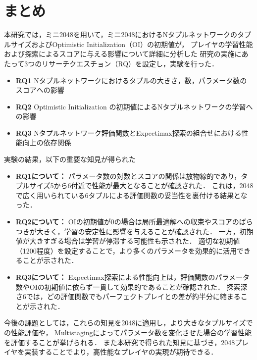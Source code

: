 \section{まとめ}
本研究では，ミニ2048を用いて，ミニ2048におけるNタプルネットワークのタプルサイズおよびOptimistic Initialization（OI）の初期値が，
プレイヤの学習性能および探索によるスコアに与える影響について詳細に分析した
研究の実施にあたって3つのリサーチクエスチョン（RQ）を設定し，実験を行った．

\begin{itemize}
\item \textbf{RQ1} Nタプルネットワークにおけるタプルの大きさ，数，パラメータ数のスコアへの影響
\item \textbf{RQ2} Optimistic Initialization の初期値によるNタプルネットワークの学習への影響
\item \textbf{RQ3} Nタプルネットワーク評価関数とExpectimax探索の組合せにおける性能向上の依存関係
\end{itemize}

実験の結果，以下の重要な知見が得られた
\begin{itemize}
\item \textbf{RQ1について：}
パラメータ数の対数とスコアの関係は放物線的であり，タプルサイズ5から6付近で性能が最大となることが確認された．
これは，2048で広く用いられている6タプルによる評価関数の妥当性を裏付ける結果となった．

\item \textbf{RQ2について：}
OIの初期値が0の場合は局所最適解への収束やスコアのばらつきが大きく，学習の安定性に影響を与えることが確認された．
一方，初期値が大きすぎる場合は学習が停滞する可能性も示された．
適切な初期値（1200程度）を設定することで，より多くのパラメータを効果的に活用できることが示された．

\item \textbf{RQ3について：}
Expectimax探索による性能向上は，評価関数のパラメータ数やOIの初期値に依らず一貫して効果的であることが確認された．
探索深さ6では，どの評価関数でもパーフェクトプレイとの差が約半分に縮まることが示された．
\end{itemize}

今後の課題としては，これらの知見を2048に適用し，より大きなタプルサイズでの性能評価や，
Multistagingによってパラメータ数を変化させた場合の学習性能を評価することが挙げられる．
また本研究で得られた知見に基づき，2048プレイヤを実装することでより，高性能なプレイヤの実現が期待できる．


